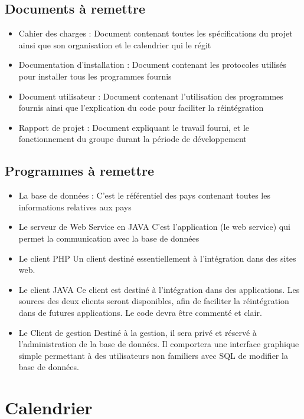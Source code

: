 \documentclass[12pt,a4paper,article]{memoir} %
\begin{document}
\section{Documents à remettre}
\begin{itemize}
\item Cahier des charges : Document contenant toutes les spécifications du projet ainsi que
son organisation et le calendrier qui le régit
\item Documentation d’installation : Document contenant les protocoles utilisés pour
installer tous les programmes fournis
\item Document utilisateur : Document contenant l’utilisation des programmes fournis ainsi
que l’explication du code pour faciliter la réintégration
\item Rapport de projet : Document expliquant le travail fourni, et le fonctionnement du
groupe durant la période de développement
\end{itemize}

\section{Programmes à remettre}
\begin{itemize}
\item La base de données :
C’est le référentiel des pays contenant toutes les informations relatives aux pays
\item Le serveur de Web Service en JAVA
C’est l’application (le web service) qui permet la communication avec la base de données
\item Le client PHP
Un client destiné essentiellement à l’intégration dans des sites web.
\item Le client JAVA
Ce client est destiné à l’intégration dans des applications.
Les sources des deux clients seront disponibles, afin de faciliter la réintégration dans de
futures applications. Le code devra être commenté et clair.
\item Le Client de gestion
Destiné à la gestion, il sera privé et réservé à l’administration de la base de données. Il
comportera une interface graphique simple permettant à des utilisateurs non familiers avec
SQL de modifier la base de données.
\end{itemize}

\chapter{Calendrier}
\end{document}
